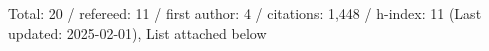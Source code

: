 Total: 20 / refereed: 11 / first author: 4 / citations: 1,448 / h-index: 11 (Last updated: 2025-02-01), List attached below